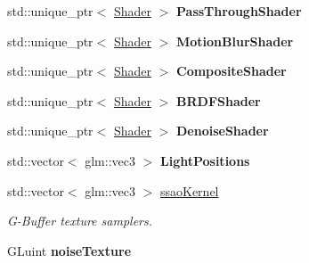 \begin{DoxyCompactItemize}
\item 
std\+::unique\+\_\+ptr$<$ \hyperlink{class_shader}{Shader} $>$ {\bfseries Pass\+Through\+Shader}\hypertarget{class_post_process_a822b12610954935381a77a9a22cc4161}{}\label{class_post_process_a822b12610954935381a77a9a22cc4161}

\item 
std\+::unique\+\_\+ptr$<$ \hyperlink{class_shader}{Shader} $>$ {\bfseries Motion\+Blur\+Shader}\hypertarget{class_post_process_a66fbc9476445c5f5fd0244a5d5624984}{}\label{class_post_process_a66fbc9476445c5f5fd0244a5d5624984}

\item 
std\+::unique\+\_\+ptr$<$ \hyperlink{class_shader}{Shader} $>$ {\bfseries Composite\+Shader}\hypertarget{class_post_process_a6eb2776a528af973c3ec52f9204b6814}{}\label{class_post_process_a6eb2776a528af973c3ec52f9204b6814}

\item 
std\+::unique\+\_\+ptr$<$ \hyperlink{class_shader}{Shader} $>$ {\bfseries B\+R\+D\+F\+Shader}\hypertarget{class_post_process_a29a10cf915ff785fad4e9b7ef86ef9da}{}\label{class_post_process_a29a10cf915ff785fad4e9b7ef86ef9da}

\item 
std\+::unique\+\_\+ptr$<$ \hyperlink{class_shader}{Shader} $>$ {\bfseries Denoise\+Shader}\hypertarget{class_post_process_a4bc30a05f094474f0779b8ee7ed4201d}{}\label{class_post_process_a4bc30a05f094474f0779b8ee7ed4201d}

\item 
std\+::vector$<$ glm\+::vec3 $>$ {\bfseries Light\+Positions}\hypertarget{class_post_process_ae4c43bee583e81707ccb4ed69ced965e}{}\label{class_post_process_ae4c43bee583e81707ccb4ed69ced965e}

\item 
std\+::vector$<$ glm\+::vec3 $>$ \hyperlink{class_post_process_ad2b9c44c832a3be92faabf48dfd8009e}{ssao\+Kernel}\hypertarget{class_post_process_ad2b9c44c832a3be92faabf48dfd8009e}{}\label{class_post_process_ad2b9c44c832a3be92faabf48dfd8009e}

\begin{DoxyCompactList}\small\item\em G-\/\+Buffer texture samplers. \end{DoxyCompactList}\item 
G\+Luint {\bfseries noise\+Texture}\hypertarget{class_post_process_a4686a88757a73c7722ba3b35990ad284}{}\label{class_post_process_a4686a88757a73c7722ba3b35990ad284}


\end{DoxyCompactItemize}
